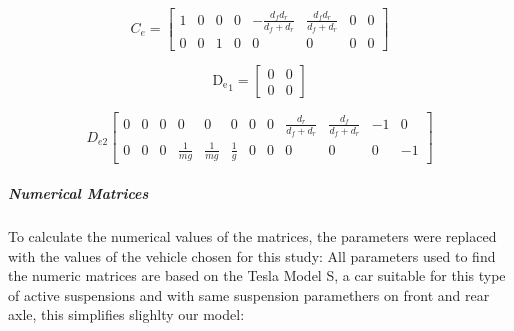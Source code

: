 \documentclass[]{report}
\begin{document}
\begin{equation}
	C_e =
	\begin{bmatrix}
		1 & 0 & 0 & 0 & -\frac{d_f d_r}{d_f + d_r} & \frac{d_f d_r}{d_f + d_r} & 0 & 0 \\
		0 & 0 & 1 & 0 & 0 & 0 & 0 & 0
	\end{bmatrix}
\end{equation}


	
	\begin{equation}
		\mathrm{D_e}_1 =
		\begin{bmatrix}
			0 & 0 \\
			0 & 0
		\end{bmatrix}
	\end{equation}
	


\begin{equation}
	D_{e2}
	\left[ 
	\begin{array}{cccccccccccc}
		0 & 0 & 0 & 0 & 0 & 0 & 0 & 0 & \frac{d_r}{d_f+d_r} & \frac{d_f}{d_f+d_r} & -1 & 0 \\
		0 & 0 & 0 & \frac{1}{mg} & \frac{1}{mg} & \frac{1}{g} & 0 & 0 & 0 & 0 & 0 & -1
	\end{array}\right] 
\end{equation}
	\vspace{0.5cm}
	\subparagraph{Numerical Matrices}
	To calculate the numerical values of the matrices, the parameters were replaced with the values of the vehicle chosen for this study: All parameters used to find the numeric matrices are based on the Tesla Model S, a car suitable for this type of active suspensions and with same suspension paramethers on front and rear axle, this simplifies slighlty our model:\\
	
\end{document}
